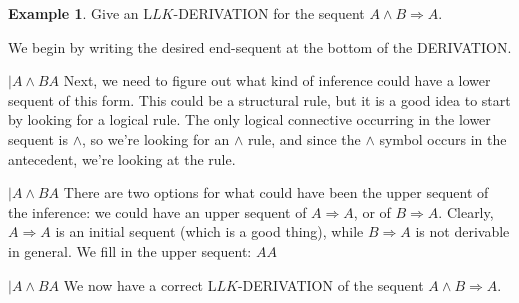 \documentclass[10pt,a4paper]{article}
\newcommand*{\olup}[1]{\MakeUppercase{#1}}
\theoremstyle{plain}
\theoremstyle{definition}
\newtheorem{ex}[thm]{Example}
\theoremstyle{remark}
\providecommand{\AxiomC}[1]{}
\providecommand{\RightLabel}[1]{}
\providecommand{\fCenter}{}
\newenvironment{prooftree}{}{}
\providecommand{\Sequent}{\mathrel{\Rightarrow}}
\providecommand{\Log}{\ensuremath{\mathrm{L}}}
\providecommand{\LeftR}[1]{}
\providecommand{\UnaryInf}{\ensuremath{\mid}}
\providecommand{\LeftR}{\mathrm{L}}
\providecommand{\Axiom}{\mathrm{Ax}}
\begin{document}
\begin{ex}
Give an $\Log{LK}$-\olup{derivation} for the sequent $A \land B \Sequent A$.

We begin by writing the desired end-sequent at the bottom of the
\olup{derivation}.
\begin{prooftree}
\AxiomC{}
\UnaryInf$A\land B \fCenter A$
\end{prooftree}
Next, we need to figure out what kind of inference could have a lower
sequent of this form. This could be a structural rule, but it is a
good idea to start by looking for a logical rule. The only logical
connective occurring in the lower sequent is $\land$,
so we're looking for an $\land$ rule, and since the $\land$ symbol
occurs in the antecedent, we're looking at the \LeftR{\land}
rule.
\begin{prooftree}
\AxiomC{}
\RightLabel{\LeftR{\land}}
\UnaryInf$A\land B \fCenter A$
\end{prooftree}
There are two options for what could have been the upper sequent of
the \LeftR{\land} inference: we could have an upper sequent of $A
\Sequent A$, or of $B \Sequent A$. Clearly, $A \Sequent A$ is an
initial sequent (which is a good thing), while $B \Sequent A$ is not
derivable in general. We fill in the upper sequent:
\begin{prooftree}
\Axiom$A \fCenter A$
\RightLabel{\LeftR{\land}}
\UnaryInf$A\land B \fCenter A$
\end{prooftree}
We now have a correct $\Log{LK}$-\olup{derivation} of the sequent $A
\land B \Sequent A$.
\end{ex}
\end{document}
